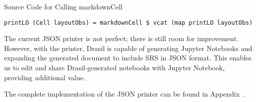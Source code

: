 \begin{listing}[h]
	\caption{Source Code for Calling markdownCell}
	\label{code:callmarkdownCell}
	\begin{lstlisting}[language=haskell1]
		printLO (Cell layoutObs) = markdownCell $ vcat (map printLO layoutObs)
	\end{lstlisting}
\end{listing}

The current JSON printer is not perfect; there is still room for improvement. 
 However, with the printer, Drasil is capable of 
generating Jupyter Notebooks and expanding the generated document to include 
SRS in JSON format. This enables us to edit and share Drasil-generated 
notebooks with Jupyter Notebook, providing additional value.
 
The complete implementation of the JSON printer can be found in 
Appendix~.